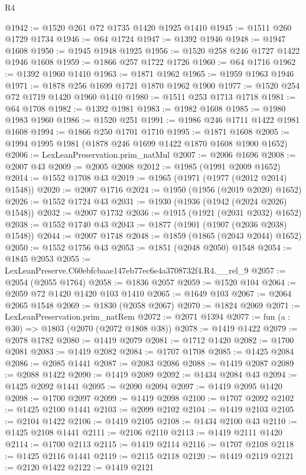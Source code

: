 \begin{lexlean}{R4}
\begin{coremodule}
@1942 := @1520 @261 @72 @1735 @1420 @1925 @1410
@1945 := @1511 @260 @1729 @1734
@1946 := @64 @1724
@1947 := @1392 @1946
@1948 := @1947 @1608
@1950 := @1945 @1948 @1925
@1956 := @1520 @258 @246 @1727 @1422 @1946 @1608
@1959 := @1866 @257 @1722 @1726
@1960 := @64 @1716
@1962 := @1392 @1960 @1410
@1963 := @1871 @1962
@1965 := @1959 @1963 @1946
@1971 := @1878 @256 @1699 @1721 @1870 @1962 @1900
@1977 := @1520 @254 @72 @1719 @1420 @1960 @1410
@1980 := @1511 @253 @1713 @1718
@1981 := @64 @1708
@1982 := @1392 @1981
@1983 := @1982 @1608
@1985 := @1980 @1983 @1960
@1986 := @1520 @251
@1991 := @1986 @246 @1711 @1422 @1981 @1608
@1994 := @1866 @250 @1701 @1710
@1995 := @1871 @1608
@2005 := @1994 @1995 @1981 (@1878 @246 @1699 @1422 @1870 @1608 @1900 @1652)
@2006 := LexLeanPreservation.prim_natMul
@2007 := @2006 @1696
@2008 := @2007 @43
@2009 := @2005 @2008
@2012 := @1985 (@1991 @2009 @1652)
@2014 := @1552 @1708 @43
@2019 := @1965 (@1971 (@1977 (@2012 @2014) @1548))
@2020 := @2007 @1716
@2024 := @1950 (@1956 (@2019 @2020) @1652)
@2026 := @1552 @1724 @43
@2031 := @1930 (@1936 (@1942 (@2024 @2026) @1548))
@2032 := @2007 @1732
@2036 := @1915 (@1921 (@2031 @2032) @1652)
@2038 := @1552 @1740 @43
@2043 := @1877 (@1901 (@1907 (@2036 @2038) @1548))
@2044 := @2007 @1748
@2048 := @1859 (@1865 (@2043 @2044) @1652)
@2050 := @1552 @1756 @43
@2053 := @1851 (@2048 @2050) @1548
@2054 := @1845 @2053
@2055 := LexLeanPreserve.C60ebfcbaae147eb77ec6e4a3708732f4.R4.__rel_9
@2057 := @2054 (@2055 @1764)
@2058 := @1836 @2057
@2059 := @1520 @104
@2064 := @2059 @72 @1420 @1420 @103 @1410
@2065 := @1649 @103
@2067 := @2064 @2065 @1548
@2069 := @1830 (@2058 @2067)
@2070 := @1824 @2069
@2071 := LexLeanPreservation.prim_natRem
@2072 := @2071 @1394
@2077 := fun (a : @30) => @1803 (@2070 (@2072 @1808 @38))
@2078 := @1419 @1422
@2079 := @2078 @1782
@2080 := @1419 @2079
@2081 := @1712 @1420
@2082 := @1700 @2081
@2083 := @1419 @2082
@2084 := @1707 @1708
@2085 := @1425 @2084
@2086 := @2085 @1441
@2087 := @2083 @2086
@2088 := @1419 @2087
@2089 := @2088 @1422
@2090 := @1419 @2089
@2092 := @1434 @2084 @43
@2094 := @1425 @2092 @1441
@2095 := @2090 @2094
@2097 := @1419 @2095 @1420
@2098 := @1700 @2097
@2099 := @1419 @2098
@2100 := @1707 @2092
@2102 := @1425 @2100 @1441
@2103 := @2099 @2102
@2104 := @1419 @2103
@2105 := @2104 @1422
@2106 := @1419 @2105
@2108 := @1434 @2100 @43
@2110 := @1425 @2108 @1441
@2111 := @2106 @2110
@2113 := @1419 @2111 @1420
@2114 := @1700 @2113
@2115 := @1419 @2114
@2116 := @1707 @2108
@2118 := @1425 @2116 @1441
@2119 := @2115 @2118
@2120 := @1419 @2119
@2121 := @2120 @1422
@2122 := @1419 @2121

\end{coremodule}
\end{lexlean}
